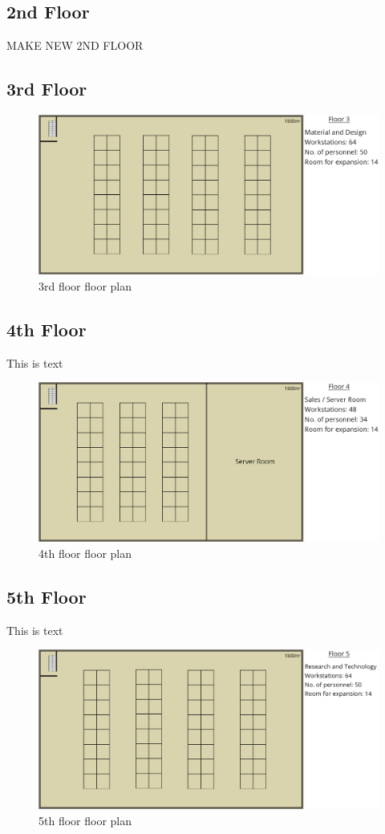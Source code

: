 \subsection{2nd Floor}
\begin{huge}
    MAKE NEW 2ND FLOOR
\end{huge}
\subsection{3rd Floor}
\begin{figure}[!h]
    \includegraphics[width=15cm]{Figures/3rd-Floor.png}
    \caption{3rd floor floor plan}
    \label{3rd_floor}
\end{figure}
\subsection{4th Floor}
This is text
\begin{figure}[!h]
    \includegraphics[width=15cm]{Figures/4th-Floor.png}
    \caption{4th floor floor plan}
    \label{4th_floor}
\end{figure}
\subsection{5th Floor}
This is text
\begin{figure}[!h]
    \includegraphics[width=15cm]{Figures/5th-Floor.png}
    \caption{5th floor floor plan}
    \label{5th_floor}
\end{figure}
